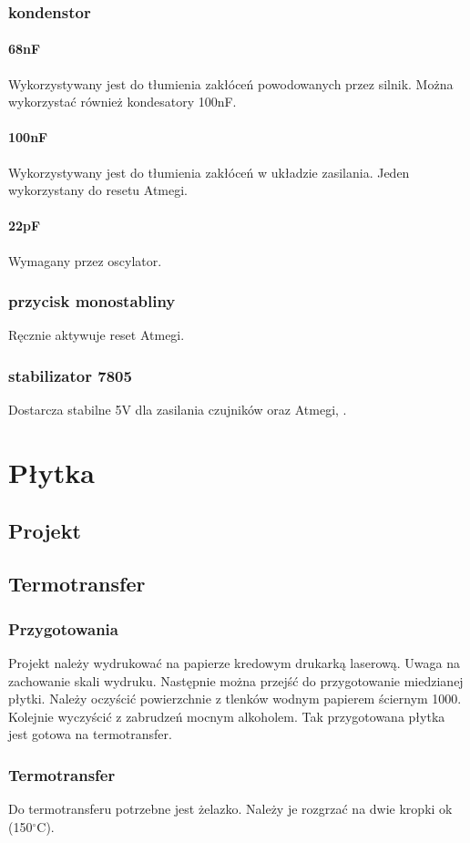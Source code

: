 \documentclass[a4paper,11pt]{article}
\begin{document}
\subsubsection{kondenstor}
	\paragraph{68nF}
Wykorzystywany jest do tłumienia zakłóceń powodowanych przez silnik. Można wykorzystać również kondesatory 100nF.
	\paragraph{100nF}
	Wykorzystywany jest do tłumienia zakłóceń w układzie zasilania. Jeden wykorzystany do resetu Atmegi.
	\paragraph{22pF}
	Wymagany przez oscylator.
\subsubsection{przycisk monostabliny}
	Ręcznie aktywuje reset Atmegi.
\subsubsection{stabilizator 7805}
	Dostarcza stabilne 5V dla zasilania czujników oraz Atmegi, .
	
\section{Płytka}
\subsection{Projekt}
\subsection{Termotransfer}
\subsubsection{Przygotowania}
Projekt należy wydrukować na papierze kredowym drukarką laserową. Uwaga na zachowanie skali wydruku. Następnie można przejść do przygotowanie miedzianej płytki. Należy oczyścić powierzchnie z tlenków wodnym papierem ściernym 1000. Kolejnie wyczyścić z zabrudzeń mocnym alkoholem. Tak przygotowana płytka jest gotowa na termotransfer.
\subsubsection{Termotransfer}
Do termotransferu potrzebne jest żelazko. Należy je rozgrzać na dwie kropki ok (150$^\circ$C).
\end{document}
